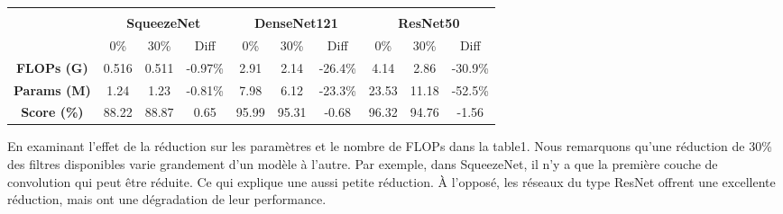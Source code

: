 \documentclass[12pt]{article}
\begin{document}
\begin{table}[H]
\begin{tabular}{cccccccccc}
	\multicolumn{1}{l}{}                    & \multicolumn{1}{l}{}      & \multicolumn{1}{l}{}      & \multicolumn{1}{l}{}                                & \multicolumn{1}{l}{}      & \multicolumn{1}{l}{}      & \multicolumn{1}{l}{}                                & \multicolumn{1}{l}{}      & \multicolumn{1}{l}{}      & \multicolumn{1}{l}{}                               \\
	& \multicolumn{3}{c}{\textbf{SqueezeNet}}                                                                     & \multicolumn{3}{c}{\textbf{DenseNet121}}                                                                    & \multicolumn{3}{c}{\textbf{ResNet50}}                                                                      \\
	& 0\%                       & 30\%                      & Diff                                                & 0\%                       & 30\%                      & Diff                                                & 0\%                       & 30\%                      & Diff                                               \\ \cline{2-10} 
	\multicolumn{1}{c|}{\textbf{FLOPs (G)}}  & 0.516                     & 0.511                     & \multicolumn{1}{c|}{{\color[HTML]{009901} -0.97\%}} & 2.91                      & 2.14                      & \multicolumn{1}{c|}{{\color[HTML]{009901} -26.4\%}} & 4.14                      & 2.86                      & {\color[HTML]{009901} -30.9\%}                     \\
	\multicolumn{1}{c|}{\textbf{Params (M)}} & 1.24                      & 1.23                      & \multicolumn{1}{c|}{{\color[HTML]{009901} -0.81\%}} & 7.98                      & 6.12                      & \multicolumn{1}{c|}{{\color[HTML]{009901} -23.3\%}} & 23.53                     & 11.18                     & {\color[HTML]{009901} -52.5\%}                     \\
	\multicolumn{1}{c|}{\textbf{Score (\%)}} & 88.22                     & 88.87                     & \multicolumn{1}{c|}{{\color[HTML]{009901} 0.65}}    & 95.99                     & 95.31                     & \multicolumn{1}{c|}{{\color[HTML]{9A0000} -0.68}}   & 96.32                     & 94.76                     & {\color[HTML]{9A0000} -1.56}                      
\end{tabular}
\end{table}
\newpage
En examinant l’effet de la réduction sur les paramètres et le nombre de FLOPs dans la table1.  Nous remarquons qu'une réduction de 30\% des filtres disponibles varie grandement d’un modèle à l’autre. Par exemple, dans SqueezeNet, il n’y a que la première couche de convolution qui peut être réduite. Ce qui explique une aussi petite réduction. À l’opposé, les réseaux du type ResNet offrent une excellente réduction, mais ont une dégradation de leur performance. 
\end{document}
